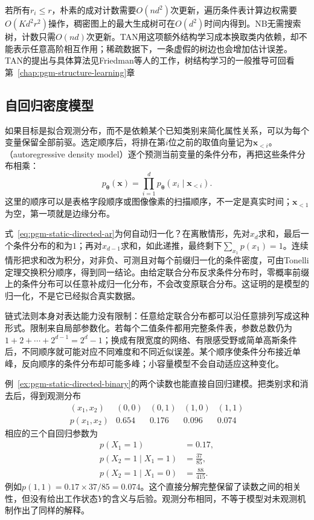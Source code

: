 若所有$r_i\le r$，朴素的成对计数需要$O(nd^2)$次更新，遍历条件表计算边权需要$O(Kd^2r^2)$操作，稠密图上的最大生成树可在$O(d^2)$时间内得到。NB无需搜索树，计数只需$O(nd)$次更新。TAN用这项额外结构学习成本换取类内依赖，却不能表示任意高阶相互作用；稀疏数据下，一条虚假的树边也会增加估计误差。TAN的提出与具体算法见Friedman等人的工作，树结构学习的一般推导可回看第~\ref{chap:pgm-structure-learning}章

\subsection{自回归密度模型}
\label{sec:pgm-static-directed-autoregressive}

如果目标是拟合观测分布，而不是依赖某个已知类别来简化属性关系，可以为每个变量保留全部前驱。选定顺序后，将排在第$i$位之前的取值向量记为$\bm{x}_{<i}$。（autoregressive density model）逐个预测当前变量的条件分布，再把这些条件分布相乘：
\begin{equation}
  \label{eq:pgm-static-directed-ar}
  p_{\bm{\theta}}(\bm{x})
    =\prod_{i=1}^{d}p_{\bm{\theta}}(x_i\mid\bm{x}_{<i}).
\end{equation}
这里的顺序可以是表格字段顺序或图像像素的扫描顺序，不一定是真实时间；$\bm{x}_{<1}$为空，第一项就是边缘分布。

式~\eqref{eq:pgm-static-directed-ar}为何自动归一化？在离散情形，先对$x_d$求和，最后一个条件分布的和为$1$；再对$x_{d-1}$求和，如此递推，最终剩下$\sum_{x_1}p(x_1)=1$。连续情形把求和改为积分，对非负、可测且对每个前缀归一化的条件密度，可由Tonelli定理交换积分顺序，得到同一结论。由给定联合分布反求条件分布时，零概率前缀上的条件分布可以任意补成归一化分布，不会改变原联合分布。这证明的是模型的归一化，不是它已经拟合真实数据。

链式法则本身对表达能力没有限制：任意给定联合分布都可以沿任意排列写成这种形式。限制来自局部参数化。若每个二值条件都用完整条件表，参数总数仍为$1+2+\cdots+2^{d-1}=2^d-1$；换成有限宽度的网络、有限感受野或简单高斯条件后，不同顺序就可能对应不同难度和不同近似误差。某个顺序使条件分布接近单峰，反向顺序的条件分布却可能多峰；小容量模型不会自动适应这种变化。

例~\ref{ex:pgm-static-directed-binary}的两个读数也能直接自回归建模。把类别求和消去后，得到观测分布
\[
  \begin{array}{ccccc}
    (x_1,x_2)&(0,0)&(0,1)&(1,0)&(1,1)\\
    p(x_1,x_2)&0.654&0.176&0.096&0.074
  \end{array}
\]
相应的三个自回归参数为
\[
  \begin{aligned}
    p(X_1=1)&=0.17,\\
    p(X_2=1\mid X_1=1)&=\frac{37}{85},\\
    p(X_2=1\mid X_1=0)&=\frac{88}{415}.
  \end{aligned}
\]
例如$p(1,1)=0.17\times37/85=0.074$。这个直接分解完整保留了读数之间的相关性，但没有给出工作状态$Y$的含义与后验。观测分布相同，不等于模型对未观测机制作出了同样的解释。


